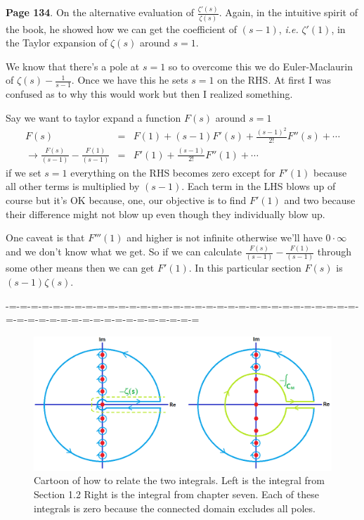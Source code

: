 \documentclass[aps,preprint,preprintnumbers,nofootinbib,showpacs,prd]{revtex4-1}
\newcommand{\ie}{{\it i.e.} }
\newcommand{\nbea}{\begin{eqnarray*}}
\newcommand{\neea}{\end{eqnarray*}}
\begin{document}
{\bf Page 134}. On the alternative evaluation of $\frac{\zeta'(s)}{\zeta(s)}$. Again, in the intuitive spirit of the book, he showed how we can get the coefficient of $(s-1)$, \ie $\zeta'(1)$, in the Taylor expansion of $\zeta(s)$ around $s = 1$.

We know that there's a pole at $s = 1$ so to overcome this we do Euler-Maclaurin of $\zeta(s) - \frac{1}{s-1}$. Once we have this he sets $s = 1$ on the RHS. At first I was confused as to why this would work but then I realized something.

Say we want to taylor expand a function $F(s)$ around $s = 1$
%
\nbea
F(s) & = & F(1) + (s - 1)F'(s) + \frac{(s - 1)^2}{2!} F''(s) + \cdots \\
\to \frac{F(s)}{(s-1)} - \frac{F(1)}{(s - 1)} & = &  F'(1) + \frac{(s - 1)}{2!} F''(1) + \cdots
\neea
%
if we set $s = 1$ everything on the RHS becomes zero except for $F'(1)$ because all other terms is multiplied by $(s - 1)$. Each term in the LHS blows up of course but it's OK because, one, our objective is to find $F'(1)$ and two because their difference might not blow up even though they individually blow up.

One caveat is that $F'''(1)$ and higher is not infinite otherwise we'll have $0\cdot\infty$ and we don't know what we get. So if we can calculate $\frac{F(s)}{(s-1)} - \frac{F(1)}{(s - 1)}$ through some other means then we can get $F'(1)$. In this particular section $F(s)$ is $(s - 1)\zeta(s)$.


-=-=-=-=-=-=-=-=-=-=-=-=-=-=-=-=-=-=-=-=-=-=-=-=-=-=-=-=-=-=-=-=-=-=-=-=-=-=-=-=-=-=-=-=-=-=-=-=-=-=

%
\begin{figure}
\centering
  \includegraphics[width=1.08\linewidth]{M_Contour.png}
  \caption{Cartoon of how to relate the two integrals. Left is the integral from Section 1.2 Right is the integral from chapter seven. Each of these integrals is zero because the connected domain excludes all poles.}
\label{fig:branch1}
\end{figure}
%
\end{document}

